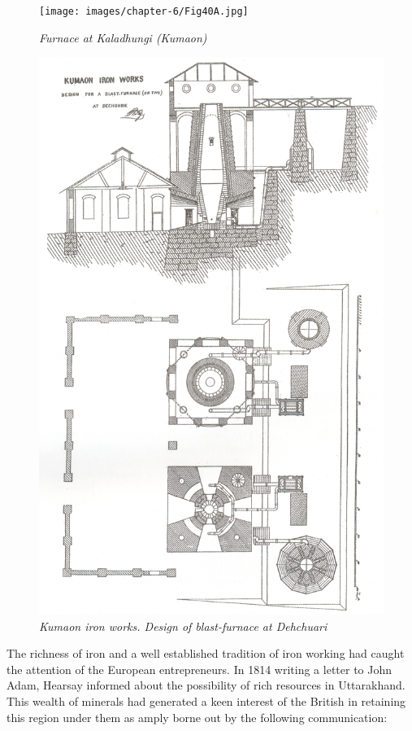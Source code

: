 \begin{figure}[H]
\renewcommand{\thefigure}{40A}
\texttt{[image: images/chapter-6/Fig40A.jpg]}
\caption{\textit{Furnace at Kaladhungi (Kumaon)}}\label{chapter-6-fig40A}
\end{figure}
\begin{figure}[H]
\renewcommand{\thefigure}{40B}
\includegraphics[scale=.47]{images/chapter-6/Fig40B.jpg}
\caption{\textit{Kumaon iron works. Design of blast-furnace at Dehchuari}}\label{chapter-6-fig40B}
\end{figure}


The richness of iron and a well established tradition of iron working had caught the attention of the European entrepreneurs. In 1814 writing a letter to John Adam, Hearsay informed about the possibility of rich resources in Uttarakhand. This wealth of minerals had generated a keen interest of the British in retaining this region under them as amply borne out by the following communication:


